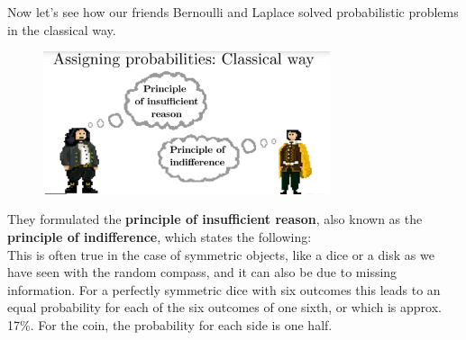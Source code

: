 \documentclass[12pt, a4paper]{scrartcl}
\begin{document}
Now let’s see how our friends Bernoulli and Laplace solved probabilistic problems in the classical way. %
\begin{figure}[H]
	\centering
	\includegraphics[width=0.75\textwidth]{1_4.png}
\end{figure}
They formulated the \textbf{principle of insufficient reason}, also known as the \textbf{principle of indifference}, which states the following:\\
This is often true in the case of symmetric objects, like a dice or a disk as we have seen with the random compass, and it can also be due to missing information.
For a perfectly symmetric dice with six outcomes this leads to an equal probability for each of the six outcomes of one sixth, or which is approx. 17\%. 
For the coin, the probability for each side is one half.\\
\end{document}
